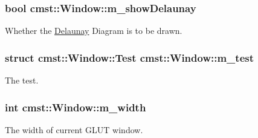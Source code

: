 \subsubsection[{\texorpdfstring{m\_showDelaunay}{m_showDelaunay}}]{\setlength{\rightskip}{0pt plus 5cm}bool cmst::Window::m\_showDelaunay\hspace{0.3cm}{\ttfamily [private]}}\hypertarget{classcmst_1_1_window_a527a10c574abe1ad1e0279465b07a7f0}{}\label{classcmst_1_1_window_a527a10c574abe1ad1e0279465b07a7f0}


Whether the \hyperlink{class_delaunay}{Delaunay} Diagram is to be drawn. 

\subsubsection[{\texorpdfstring{m\_test}{m_test}}]{\setlength{\rightskip}{0pt plus 5cm}struct {\bf cmst::Window::Test}  cmst::Window::m\_test\hspace{0.3cm}{\ttfamily [protected]}}\hypertarget{classcmst_1_1_window_aedae466fb2efd886cea6d775b20fabe3}{}\label{classcmst_1_1_window_aedae466fb2efd886cea6d775b20fabe3}


The test. 

\subsubsection[{\texorpdfstring{m\_width}{m_width}}]{\setlength{\rightskip}{0pt plus 5cm}int cmst::Window::m\_width\hspace{0.3cm}{\ttfamily [private]}}\hypertarget{classcmst_1_1_window_a2955f1032cf2ab577a5f01776e46f671}{}\label{classcmst_1_1_window_a2955f1032cf2ab577a5f01776e46f671}


The width of current GLUT window. 

